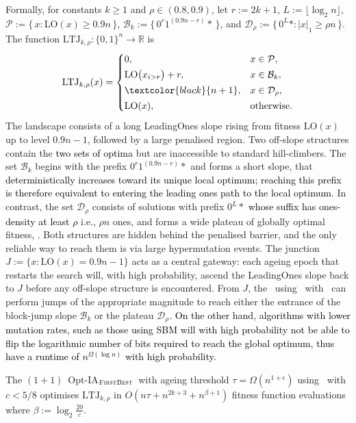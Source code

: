 
Formally, for constants $k\ge1$ and $\rho\in(0.8,0.9)$, let $r := 2k+1$, 
$L := \lfloor\log_2 n\rfloor$, 
$\mathcal{P} := \{\,x : \mathrm{LO}(x)\ge 0.9n\,\}$, 
$\mathcal{B}_k := \{\,0^{r} 1^{(0.9n-r)} *\,\}$, 
and $\mathcal{D}_\rho := \{\,0^{L} * : |x|_1 \ge \rho n\,\}$.
The function $\mathrm{LTJ}_{k,\rho} : \{0,1\}^n \to \mathbb{R}$ is
\[
\mathrm{LTJ}_{k,\rho}(x)
=
\begin{cases}
	0, & x \in \mathcal{P},\\[2pt]
	\mathrm{LO}\bigl(x_{i>r}\bigr)+r, & x \in \mathcal{B}_k,\\[2pt]
	\textcolor{black}{n+1}, & x \in \mathcal{D}_\rho,\\[2pt]
	\mathrm{LO}(x), & \text{otherwise.}
\end{cases}
\]
The landscape consists of a long LeadingOnes slope rising from fitness 
$\mathrm{LO}(x)$ up to level $0.9n-1$, followed by a large penalised region.  
Two off-slope structures contain the \textcolor{black}{two sets of optima} but are inaccessible to 
standard hill-climbers.  
The set $\mathcal{B}_k$ begins with the prefix $0^{r}1^{(0.9n-r)} *$ and forms a 
short slope,  that \textcolor{black}{deterministically increases toward its unique local optimum; reaching 
this prefix is therefore equivalent to entering the leading ones path to the local optimum.}  
In contrast, the set $\mathcal{D}_\rho$ consists of solutions with prefix 
$0^{L} *$ \textcolor{black}{whose suffix has ones-density at least $\rho$} i.e., $\rho n$ ones, and forms a wide 
plateau of globally optimal fitness, .  
Both structures are hidden behind the penalised barrier, and the only reliable 
way to reach them is via large hypermutation events.  
The junction $J := \{x : \mathrm{LO}(x)=0.9n-1\}$ acts as a central gateway: 
each ageing epoch that restarts the search will, with high probability, ascend 
the LeadingOnes slope back to $J$ before any off-slope structure is encountered.  
From $J$, the \oneoneOPTIA~using \IPHfcm{}~with \linHD~can perform jumps of the 
appropriate magnitude to reach either the entrance of the block-jump slope $\mathcal{B}_k$ or 
the plateau $\mathcal{D}_\rho$. \textcolor{black}{On the other hand, algorithms with lower mutation rates, such as those using SBM will with high probability not be able to flip the logarithmic number of bits required to reach the global optimum, thus have a runtime of $n^{\Omega(\log n)}$ with high probability.}

\begin{theorem} \label{thm:main-tau-final}
The  $(1+1)$~Opt-IA$_{\textsc{FirstBest}}$~with ageing threshold $\tau=\Omega(n^{1+\epsilon})$ using  \linHD~with $c<5/8$ optimises $\mathrm{LTJ}_{k,\rho}$ in
	$O(n\tau + n^{2k+3} + n^{\beta+1})$ fitness function evaluations	where $\beta := \log_2 \frac{20}{c}$.
\end{theorem}

